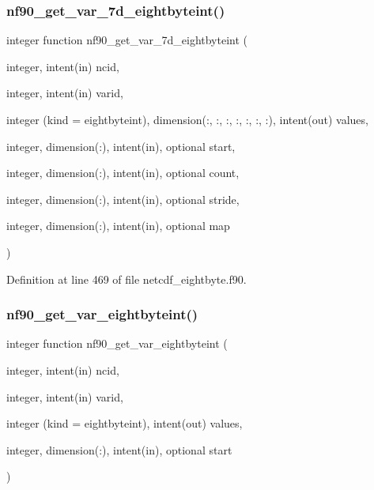 \subsubsection{\texorpdfstring{nf90\+\_\+get\+\_\+var\+\_\+7d\+\_\+eightbyteint()}{nf90\_get\_var\_7d\_eightbyteint()}}
{\footnotesize\ttfamily integer function nf90\+\_\+get\+\_\+var\+\_\+7d\+\_\+eightbyteint (\begin{DoxyParamCaption}\item[{integer, intent(in)}]{ncid,  }\item[{integer, intent(in)}]{varid,  }\item[{integer (kind = eightbyteint), dimension(\+:, \+:, \+:, \+:, \+:, \+:, \+:), intent(out)}]{values,  }\item[{integer, dimension(\+:), intent(in), optional}]{start,  }\item[{integer, dimension(\+:), intent(in), optional}]{count,  }\item[{integer, dimension(\+:), intent(in), optional}]{stride,  }\item[{integer, dimension(\+:), intent(in), optional}]{map }\end{DoxyParamCaption})}



Definition at line 469 of file netcdf\+\_\+eightbyte.\+f90.

\mbox{\label{netcdf__eightbyte_8f90_acdfad8c826daa4962a18f239a1495bf3}} 
\subsubsection{\texorpdfstring{nf90\+\_\+get\+\_\+var\+\_\+eightbyteint()}{nf90\_get\_var\_eightbyteint()}}
{\footnotesize\ttfamily integer function nf90\+\_\+get\+\_\+var\+\_\+eightbyteint (\begin{DoxyParamCaption}\item[{integer, intent(in)}]{ncid,  }\item[{integer, intent(in)}]{varid,  }\item[{integer (kind = eightbyteint), intent(out)}]{values,  }\item[{integer, dimension(\+:), intent(in), optional}]{start }\end{DoxyParamCaption})}



